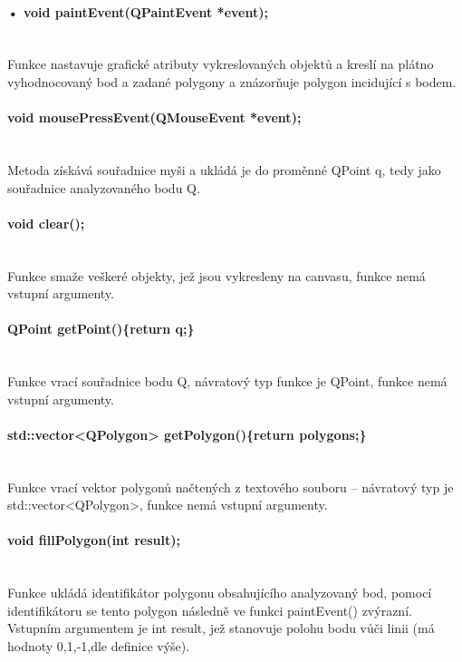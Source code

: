 \documentclass[11pt]{article}
\begin{document}
\paragraph{•	void paintEvent(QPaintEvent *event);}\mbox{}\\
Funkce nastavuje grafické atributy vykreslovaných objektů a kreslí na plátno vyhodnocovaný bod a zadané polygony a znázorňuje polygon incidující s bodem. 

\paragraph{void mousePressEvent(QMouseEvent *event);}\mbox{}\\
Metoda získává souřadnice myši a ukládá je do proměnné QPoint q, tedy jako souřadnice analyzovaného bodu Q.

\paragraph{void clear();}\mbox{}\\
Funkce smaže veškeré objekty, jež jsou vykresleny na canvasu, funkce nemá vstupní argumenty. 

\paragraph{QPoint getPoint()\{return q;\}}\mbox{}\\
Funkce vrací souřadnice bodu Q, návratový typ funkce je QPoint, funkce nemá vstupní argumenty.

\paragraph{std::vector<QPolygon> getPolygon()\{return polygons;\}}\mbox{}\\
Funkce vrací vektor polygonů načtených z textového souboru – návratový typ je std::vector<QPolygon>, funkce nemá vstupní argumenty.

\paragraph{void fillPolygon(int result);}\mbox{}\\
Funkce ukládá identifikátor polygonu obsahujícího analyzovaný bod, pomocí identifikátoru se tento polygon následně ve funkci paintEvent() zvýrazní. Vstupním argumentem je int result, jež stanovuje polohu bodu vůči linii (má hodnoty 0,1,-1,dle definice výše). 
\end{document}
